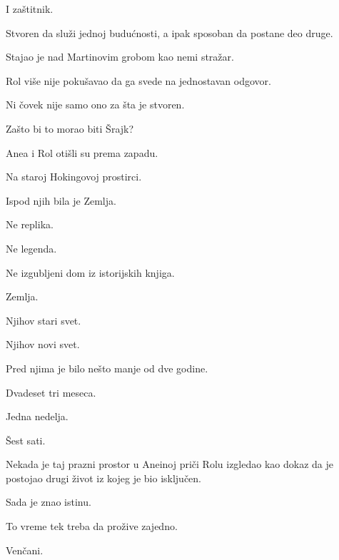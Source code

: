 \bigskip

I zaštitnik.

\bigskip

Stvoren da služi jednoj budućnosti, a ipak sposoban da postane deo druge.

\bigskip

Stajao je nad Martinovim grobom kao nemi stražar.

\bigskip

Rol više nije pokušavao da ga svede na jednostavan odgovor.

\bigskip

Ni čovek nije samo ono za šta je stvoren.

\bigskip

Zašto bi to morao biti Šrajk?

\bigskip

Anea i Rol otišli su prema zapadu.

\bigskip

Na staroj Hokingovoj prostirci.

\bigskip

Ispod njih bila je Zemlja.

\bigskip

Ne replika.

Ne legenda.

Ne izgubljeni dom iz istorijskih knjiga.

\bigskip

Zemlja.

\bigskip

Njihov stari svet.

Njihov novi svet.

\bigskip

Pred njima je bilo nešto manje od dve godine.

\bigskip

Dvadeset tri meseca.

Jedna nedelja.

Šest sati.

\bigskip

Nekada je taj prazni prostor u Aneinoj priči Rolu izgledao kao dokaz da je postojao drugi život iz kojeg je bio isključen.

\bigskip

Sada je znao istinu.

\bigskip

To vreme tek treba da prožive zajedno.

\bigskip

Venčani.

